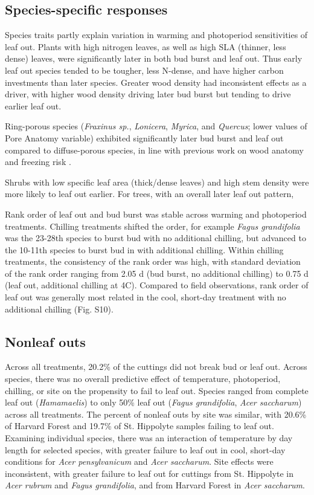 \documentclass[11pt]{article}
\begin{document}
\subsection*{Species-specific responses}

Species traits partly explain variation in warming and photoperiod sensitivities of leaf out. Plants with high nitrogen leaves, as well as high SLA (thinner, less dense) leaves, were significantly later in both bud burst and leaf out. Thus early leaf out species tended to be tougher, less N-dense, and have higher carbon investments than later species. Greater wood density had inconsistent effects as a driver, with higher wood density driving later bud burst but tending to drive earlier leaf out.

Ring-porous species (\emph{Fraxinus sp.}, \emph{Lonicera}, \emph{Myrica}, and \emph{Quercus}; lower values of Pore Anatomy variable) exhibited significantly later bud burst and leaf out compared to diffuse-porous species, in line with previous work on wood anatomy and freezing risk \cite{Sperry:1992}.

Shrubs with low specific leaf area (thick/dense leaves) and high stem density were more likely to leaf out earlier. For trees, with an overall later leaf out pattern, 

Rank order of leaf out and bud burst was stable across warming and photoperiod treatments. Chilling treatments shifted the order, for example \emph{Fagus grandifolia} was the 23-28th species to burst bud with no additional chilling, but advanced to the 10-11th species to burst bud in with additional chilling. Within chilling treatments, the consistency of the rank order was high, with standard deviation of the rank order ranging from 2.05 d (bud burst, no additional chilling) to 0.75 d (leaf out, additional chilling at 4\degree C). Compared to field observations, rank order of leaf out was generally most related in the cool, short-day treatment with no additional chilling (Fig. S10).

\subsection*{Nonleaf outs}

Across all treatments, 20.2\% of the cuttings did not break bud or leaf out. Across species, there was no overall predictive effect of temperature, photoperiod, chilling, or site on the propensity to fail to leaf out. Species ranged from complete leaf out (\emph{Hamamaelis}) to only 50\% leaf out (\emph{Fagus grandifolia}, \emph{Acer saccharum}) across all treatments. The percent of nonleaf outs by site was similar, with 20.6\% of Harvard Forest and 19.7\% of St. Hippolyte samples failing to leaf out. Examining individual species,  there was an interaction of temperature by day length for selected species, with greater failure to leaf out in cool, short-day conditions for \emph{Acer pensylvanicum}  and \emph{Acer saccharum}. Site effects were inconsistent, with greater failure to leaf out for cuttings from St. Hippolyte in \emph{Acer rubrum} and \emph{Fagus grandifolia}, and from Harvard Forest in \emph{Acer saccharum}. 
\end{document}
